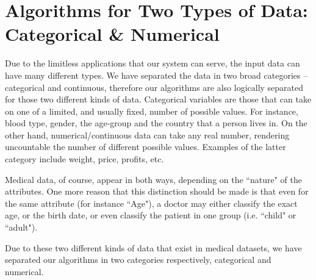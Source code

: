 \section{Algorithms for Two Types of Data: Categorical \& Numerical}\label{s:two-types-of-data}
Due to the limitless applications that our system can serve, the input data can have many different types.
We have separated the data in two broad categories -- categorical and continuous, therefore our algorithms are also logically separated for those two different kinds of data.
Categorical variables are those that can take on one of a limited, and usually fixed, number of possible values.
For instance, blood type, gender, the age-group and the country that a person lives in.
On the other hand, numerical/continuous data can take any real number, rendering uncountable the number of different possible values.
Examples of the latter category include weight, price, profits, etc.

Medical data, of course, appear in both ways, depending on the ``nature" of the attributes.
One more reason that this distinction should be made is that even for the same attribute (for instance ``Age"), a doctor may either classify the exact age, or the birth date, or even classify the patient in one group (i.e. ``child" or ``adult").

Due to these two different kinds of data that exist in medical datasets, we have separated our algorithms in two categories respectively, categorical and numerical.






